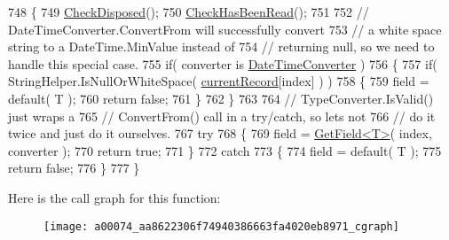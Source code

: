 \begin{DoxyCode}
748         \{
749             \hyperlink{a00074_a6fa45a46ed1322dc1872ca2321b5edbc}{CheckDisposed}();
750             \hyperlink{a00074_a2d9249171ed1568e45d152766d364c31}{CheckHasBeenRead}();
751 
752             \textcolor{comment}{// DateTimeConverter.ConvertFrom will successfully convert}
753             \textcolor{comment}{// a white space string to a DateTime.MinValue instead of}
754             \textcolor{comment}{// returning null, so we need to handle this special case.}
755             \textcolor{keywordflow}{if}( converter is \hyperlink{a00080}{DateTimeConverter} )
756             \{
757                 \textcolor{keywordflow}{if}( StringHelper.IsNullOrWhiteSpace( \hyperlink{a00074_ab2bfef15784add66e441c9d3a0d73751}{currentRecord}[index] ) )
758                 \{
759                     field = \textcolor{keywordflow}{default}( T );
760                     \textcolor{keywordflow}{return} \textcolor{keyword}{false};
761                 \}
762             \}
763 
764             \textcolor{comment}{// TypeConverter.IsValid() just wraps a}
765             \textcolor{comment}{// ConvertFrom() call in a try/catch, so lets not}
766             \textcolor{comment}{// do it twice and just do it ourselves.}
767             \textcolor{keywordflow}{try}
768             \{
769                 field = \hyperlink{a00074_a6a43cfaf39caea93ecd87e506be7b404}{GetField<T>}( index, converter );
770                 \textcolor{keywordflow}{return} \textcolor{keyword}{true};
771             \}
772             \textcolor{keywordflow}{catch}
773             \{
774                 field = \textcolor{keywordflow}{default}( T );
775                 \textcolor{keywordflow}{return} \textcolor{keyword}{false};
776             \}
777         \}
\end{DoxyCode}


Here is the call graph for this function\-:
\nopagebreak
\begin{figure}[H]
\begin{center}
\leavevmode
\texttt{[image: a00074\_aa8622306f74940386663fa4020eb8971\_cgraph]}
\end{center}
\end{figure}


